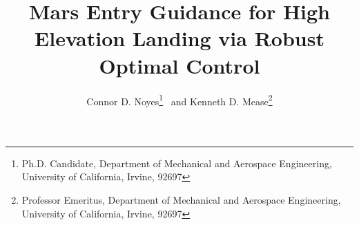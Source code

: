 \documentclass[journal ]{new-aiaa}
\title{Mars Entry Guidance for High Elevation Landing via Robust Optimal Control}
\begin{document}
\author{Connor D. Noyes\thanks{Ph.D. Candidate, Department of Mechanical and Aerospace Engineering, University of California, Irvine, 92697} \ and Kenneth D. Mease\thanks{Professor Emeritus, Department of Mechanical and Aerospace Engineering, University of California, Irvine, 92697}}
\maketitle





\end{document}
